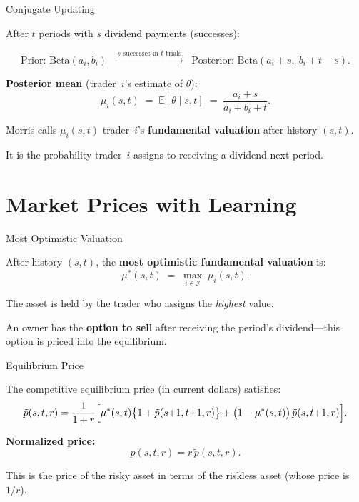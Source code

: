 \documentclass[11pt,aspectratio=169]{beamer}
\newcommand{\E}{\mathbb{E}}
\begin{document}
\begin{frame}{Conjugate Updating}

After $t$ periods with $s$ dividend payments (successes):

\[
  \text{Prior: } \text{Beta}(a_i, b_i)
  \;\;\xrightarrow{\;s \text{ successes in } t \text{ trials}\;}
  \;\;\text{Posterior: } \text{Beta}(a_i + s,\; b_i + t - s).
\]

\medskip

\textbf{Posterior mean} (trader~$i$'s estimate of $\theta$):
\[
  \mu_i(s,t) \;=\; \E[\theta \mid s,t]
  \;=\; \frac{a_i + s}{a_i + b_i + t}.
\]

\medskip

Morris calls $\mu_i(s,t)$ trader~$i$'s \textbf{fundamental valuation}
after history $(s,t)$.

It is the probability trader~$i$ assigns to receiving a dividend next
period.

\end{frame}


\section{Market Prices with Learning}

\begin{frame}{Most Optimistic Valuation}

After history $(s,t)$, the \textbf{most optimistic fundamental
valuation} is:
\[
  \mu^*(s,t) \;=\; \max_{i \in \mathcal{I}}\; \mu_i(s,t).
\]

\medskip

The asset is held by the trader who assigns the \emph{highest}
value.

\medskip

An owner has the \textbf{option to sell} after receiving the
period's dividend---this option is priced into the equilibrium.

\end{frame}

\begin{frame}{Equilibrium Price}

The competitive equilibrium price (in current dollars) satisfies:
\[
  \tilde p(s,t,r) = \frac{1}{1+r}\Bigl[
    \mu^*(s,t)\bigl\{1 + \tilde p(s{+}1,t{+}1,r)\bigr\}
    + \bigl(1-\mu^*(s,t)\bigr)\,\tilde p(s,t{+}1,r)
  \Bigr].
\]

\medskip

\textbf{Normalized price:}
\[
  p(s,t,r) = r\,\tilde p(s,t,r).
\]

This is the price of the risky asset in terms of the riskless asset
(whose price is $1/r$).

\end{frame}
\end{document}
